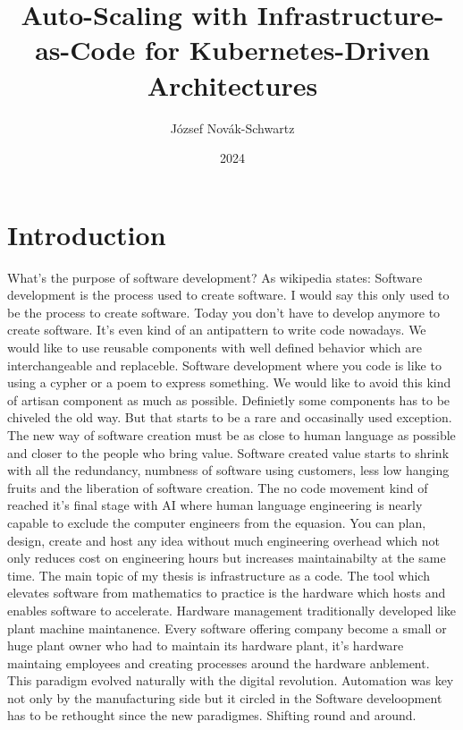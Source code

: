 \documentclass[
]{elteikthesis}[2024/04/10]
\title{Auto-Scaling with Infrastructure-as-Code for Kubernetes-Driven Architectures} %
\date{2024} %
\author{József Novák-Schwartz}
\affiliation{Associate Professor} %
\begin{document}


\maketitle
%

\tableofcontents
\cleardoublepage

\chapter{Introduction}
\label{ch:intro}

What's the purpose of software development? 
As wikipedia states: Software development is the process used to create software. I would say this only used to be the process to create software. Today you don't have to develop anymore to create software. It's even kind of an antipattern to write code nowadays. We would like  to use reusable components with well defined behavior which are interchangeable and replaceble. Software development where you code is like to using a cypher or a poem to express something. We would like to avoid this kind of artisan component as much as possible. Definietly some components has to be chiveled the old way. But that starts to be a rare and occasinally used exception. The new way of software creation must be as close to human language as possible and closer to the people who bring value. Software created value starts to shrink with all the redundancy, numbness of software using customers, less low hanging fruits and the liberation of software creation. The no code movement kind of reached it's final stage with AI where human language engineering is nearly capable to exclude the computer engineers from the equasion. You can plan, design, create and host any idea without much engineering overhead which not only reduces cost on engineering hours but increases maintainabilty at the same time.
The main topic of my thesis is infrastructure as a code. The tool which elevates software from mathematics to practice is the hardware which hosts and enables software to accelerate. Hardware management traditionally developed like plant machine maintanence. Every software offering company become a small or huge plant owner who had to maintain its hardware plant, it's hardware maintaing employees and creating processes around the hardware anblement. This paradigm evolved naturally with the digital revolution.
Automation was key not only by the manufacturing side but it circled in the 
Software develoopment has to be rethought since the new paradigmes. Shifting round and around.
\end{document}
